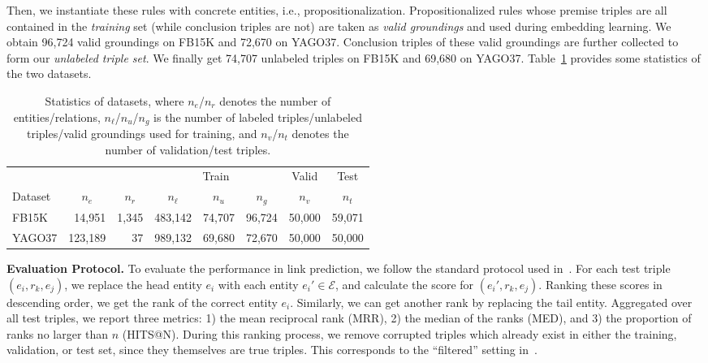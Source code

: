 \documentclass[letterpaper]{article} \usepackage{aaai18}  \usepackage{times}  \usepackage{helvet}  \usepackage{courier}  \usepackage{url}  \usepackage{graphicx}  \usepackage{amsmath}
\begin{document}
Then, we instantiate these rules with concrete entities, i.e., propositionalization. Propositionalized rules whose premise triples are all contained in the \textit{training} set (while conclusion triples are not) are taken as \textit{valid groundings} and used during embedding learning. We obtain 96,724 valid groundings on FB15K and 72,670 on YAGO37. Conclusion triples of these valid groundings are further collected to form our \textit{unlabeled triple set}. We finally get 74,707 unlabeled triples on FB15K and 69,680 on YAGO37. Table~\ref{tab:Dataset} provides some statistics of the two datasets.

\begin{table}[t]
    \centering\scriptsize\setlength{\tabcolsep}{2pt}
    \caption{\label{tab:Dataset} Statistics of datasets, where $n_e$/$n_r$ denotes the number of entities/relations, $n_\ell$/$n_u$/$n_g$ is the number of labeled triples/unlabeled triples/valid groundings used for training, and $n_v$/$n_t$ denotes the number of validation/test triples.}
    \begin{tabular*}{0.47 \textwidth}{@{\extracolsep{\fill}}@{}lrrrrrrr@{}}
        \toprule
        & & & \multicolumn{3}{c}{Train} & \multicolumn{1}{c}{Valid} & \multicolumn{1}{c}{Test} \\\cmidrule{4-6}\cmidrule{7-7}\cmidrule{8-8}
        Dataset & \multicolumn{1}{c}{$n_e$} & \multicolumn{1}{c}{$n_r$} & \multicolumn{1}{c}{$n_\ell$} & \multicolumn{1}{c}{$n_u$} & \multicolumn{1}{c}{$n_g$} & \multicolumn{1}{c}{$n_v$} & \multicolumn{1}{c}{$n_t$} \\
        \midrule
        FB15K  & 14,951    & 1,345      & 483,142   & 74,707  & 96,724  & 50,000  & 59,071 \\
        YAGO37 & 123,189   & 37         & 989,132   & 69,680  & 72,670  & 50,000  & 50,000 \\
        \bottomrule
    \end{tabular*}
\end{table}

\smallskip
\noindent\textbf{Evaluation Protocol.} To evaluate the performance in link prediction, we follow the standard protocol used in~\cite{bordes2013:TransE}. For each test triple $(e_i, r_k, e_j)$, we replace the head entity $e_i$ with each entity $e_i'\!\in\!\mathcal{E}$, and calculate the score for $(e_i', r_k, e_j)$. Ranking these scores in descending order, we get the rank of the correct entity $e_i$. Similarly, we can get another rank by replacing the tail entity. Aggregated over all test triples, we report three metrics: 1) the mean reciprocal rank (MRR), 2) the median of the ranks (MED), and 3) the proportion of ranks no larger than $n$ (HITS@N). During this ranking process, we remove corrupted triples which already exist in either the training, validation, or test set, since they themselves are true triples. This corresponds to the ``filtered'' setting in~\cite{bordes2013:TransE}.
\end{document}
